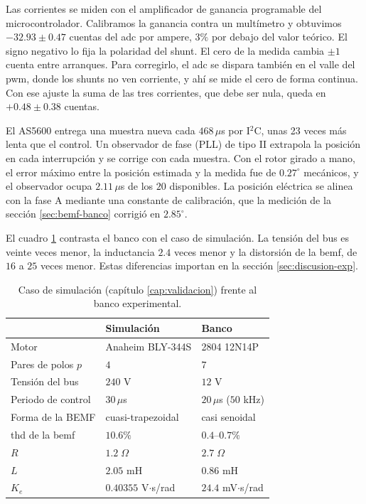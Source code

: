 \documentclass[../../../Tesis_JALS_Maestria.tex]{subfiles}
\begin{document}
Las corrientes se miden con el amplificador de ganancia programable del microcontrolador. Calibramos la ganancia contra un multímetro y obtuvimos $-32.93 \pm 0.47$ cuentas del \acrshort{adc} por ampere, $3\%$ por debajo del valor teórico. El signo negativo lo fija la polaridad del shunt. El cero de la medida cambia $\pm 1$ cuenta entre arranques. Para corregirlo, el \acrshort{adc} se dispara también en el valle del \acrshort{pwm}, donde los shunts no ven corriente, y ahí se mide el cero de forma continua. Con ese ajuste la suma de las tres corrientes, que debe ser nula, queda en $+0.48 \pm 0.38$ cuentas.

El AS5600 entrega una muestra nueva cada $468\,\mu$s por I$^2$C, unas 23 veces más lenta que el control. Un observador de fase (PLL) de tipo II extrapola la posición en cada interrupción y se corrige con cada muestra. Con el rotor girado a mano, el error máximo entre la posición estimada y la medida fue de $0.27^\circ$ mecánicos, y el observador ocupa $2.11\,\mu$s de los $20$ disponibles. La posición eléctrica se alinea con la fase A mediante una constante de calibración, que la medición de la sección \ref{sec:bemf-banco} corrigió en $2.85^\circ$.

El cuadro \ref{tab:sim-vs-banco} contrasta el banco con el caso de simulación. La tensión del bus es veinte veces menor, la inductancia $2.4$ veces menor y la distorsión de la \acrshort{bemf}, de $16$ a $25$ veces menor. Estas diferencias importan en la sección \ref{sec:discusion-exp}.

\begin{table}[htbp]
    \centering
    \caption{Caso de simulación (capítulo \ref{cap:validacion}) frente al banco experimental.}
    \label{tab:sim-vs-banco}
    \begin{tabular}{lll}
        \toprule
        & Simulación & Banco \\
        \midrule
        Motor              & Anaheim BLY-344S & 2804 12N14P \\
        Pares de polos $p$ & $4$              & $7$ \\
        Tensión del bus    & $240$ V          & $12$ V \\
        Periodo de control & $30\,\mu$s       & $20\,\mu$s ($50$ kHz) \\
        Forma de la BEMF   & cuasi-trapezoidal & casi senoidal \\
        \acrshort{thd} de la \acrshort{bemf} & $10.6\%$ & $0.4$--$0.7\%$ \\
        $R$                & $1.2\;\Omega$    & $2.7\;\Omega$ \\
        $L$                & $2.05$ mH        & $0.86$ mH \\
        $K_e$              & $0.40355$ V$\cdot$s/rad & $24.4$ mV$\cdot$s/rad \\
        \bottomrule
    \end{tabular}
\end{table}
\end{document}
